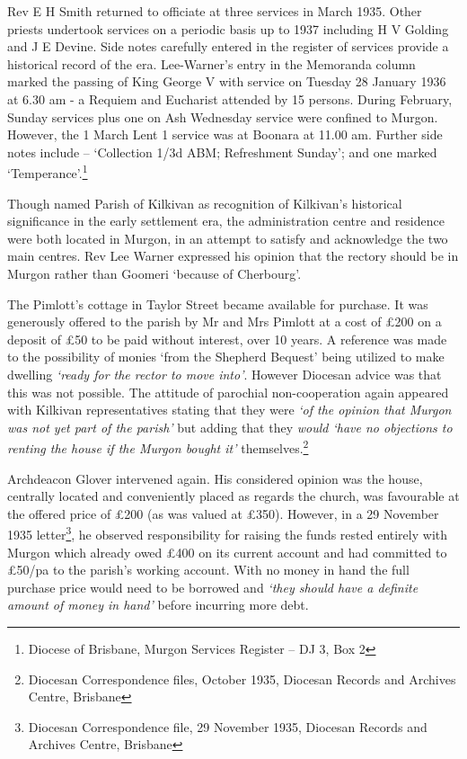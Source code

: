 Rev E H Smith returned to officiate at three services in March 1935. Other priests undertook services on a periodic basis up to 1937 including H V Golding and J E Devine. Side notes carefully entered in the register of services provide a historical record of the era. Lee-Warner's entry in the Memoranda column marked the passing of King George V with service on Tuesday 28 January 1936 at 6.30 am - a Requiem and Eucharist attended by 15 persons. During February, Sunday services plus one on Ash Wednesday service were confined to Murgon. However, the 1 March Lent 1 service was at Boonara at 11.00 am. Further side notes include -- `Collection 1/3d ABM; Refreshment Sunday'; and one marked `Temperance'.\footnote{Diocese of Brisbane, Murgon Services Register -- DJ 3, Box 2}


Though named Parish of Kilkivan as recognition of Kilkivan's historical significance in the early settlement era, the administration centre and residence were both located in Murgon, in an attempt to satisfy and acknowledge the two main centres. Rev Lee Warner expressed his opinion that the rectory should be in Murgon rather than Goomeri `because of Cherbourg'.



The Pimlott's cottage in Taylor Street became available for purchase. It was generously offered to the parish by Mr and Mrs Pimlott at a cost of \pounds200 on a deposit of \pounds50 to be paid without interest, over 10 years. A reference was made to the possibility of monies `from the Shepherd Bequest' being utilized to make dwelling \emph{`ready for the rector to move into'}. However Diocesan advice was that this was not possible. The attitude of parochial non-cooperation again appeared with Kilkivan representatives stating that they were \emph{`of the opinion that Murgon was not yet part of the parish'} but adding that they \emph{would `have no objections to renting the house if the Murgon bought it'} themselves.\footnote{Diocesan Correspondence files, October 1935, Diocesan Records and Archives Centre, Brisbane}


Archdeacon Glover intervened again. His considered opinion was the house, centrally located and conveniently placed as regards the church, was favourable at the offered price of \pounds200 (as was valued at \pounds350). However, in a 29 November 1935 letter\footnote{Diocesan Correspondence file, 29 November 1935, Diocesan Records and Archives Centre, Brisbane}, he observed responsibility for raising the funds rested entirely with Murgon which already owed \pounds400 on its current account and had committed to \pounds50/pa to the parish's working account. With no money in hand the full purchase price would need to be borrowed and \emph{`they should have a definite amount of money in hand'} before incurring more debt.



